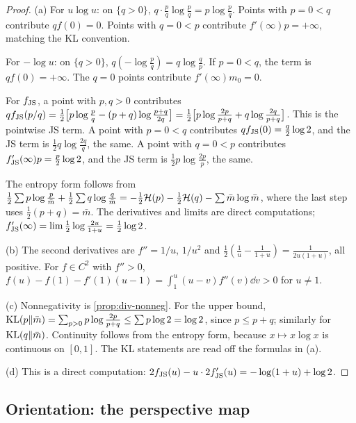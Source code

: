 \begin{proof}
(a) For $u\log u$: on $\{q>0\}$, $q\cdot\frac pq\log\frac pq=p\log\frac pq$. Points with $p=0<q$ contribute $q f(0)=0$. Points with $q=0<p$ contribute $f'(\infty)p=+\infty$, matching the KL convention.

For $-\log u$: on $\{q>0\}$, $q(-\log\frac pq)=q\log\frac qp$. If $p=0<q$, the term is $qf(0)=+\infty$. The $q=0$ points contribute $f'(\infty)m_0=0$.

For $f_{\mathrm{JS}}$, a point with $p,q>0$ contributes
$q f_{\mathrm{JS}}(p/q)=\frac12\big[p\log\frac pq-(p+q)\log\frac{p+q}{2q}\big]=\frac12\big[p\log\frac{2p}{p+q}+q\log\frac{2q}{p+q}\big]$.
This is the pointwise JS term.
A point with $p=0<q$ contributes $qf_{\mathrm{JS}}(0)=\frac q2\log2$, and the JS term is $\frac12q\log\frac{2q}q$, the same.
A point with $q=0<p$ contributes $f'_{\mathrm{JS}}(\infty)p=\frac p2\log 2$, and the JS term is $\frac12p\log\frac{2p}p$, the same.

The entropy form follows from $\frac12\sum p\log\frac p{\bar m}+\frac12\sum q\log\frac q{\bar m}=-\frac12\mathcal{H}(p)-\frac12\mathcal{H}(q)-\sum\bar m\log\bar m$, where the last step uses $\frac12(p+q)=\bar m$.
The derivatives and limits are direct computations; $f_{\mathrm{JS}}'(\infty)=\lim\frac12\log\frac{2u}{1+u}=\frac12\log2$.

(b) The second derivatives are $f''=1/u$, $1/u^2$ and $\frac12(\frac1u-\frac1{1+u})=\frac1{2u(1+u)}$, all positive.
For $f\in C^2$ with $f''>0$, $f(u)-f(1)-f'(1)(u-1)=\int_1^u(u-v)f''(v)\dd v>0$ for $u\ne1$.

(c) Nonnegativity is \cref{prop:div-nonneg}. For the upper bound, $\mathrm{KL}(p\Vert\bar m)=\sum_{p>0}p\log\frac{2p}{p+q}\le\sum p\log2=\log2$, since $p\le p+q$; similarly for $\mathrm{KL}(q\Vert\bar m)$.
Continuity follows from the entropy form, because $x\mapsto x\log x$ is continuous on $[0,1]$.
The KL statements are read off the formulas in (a).

(d) This is a direct computation: $2f_{\mathrm{JS}}(u)-u\cdot2f'_{\mathrm{JS}}(u)=-\log(1+u)+\log 2$.
\end{proof}

\subsection{Orientation: the perspective map}\label{sec:div-perspective}

